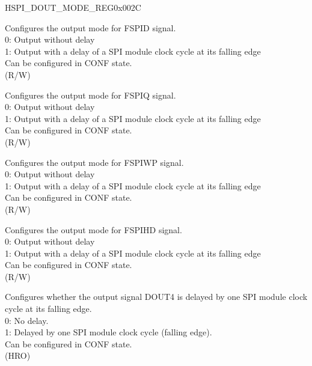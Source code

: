 \begin{register}{H}{SPI\_DOUT\_MODE\_REG}{0x002C}\label{regdesc:SPIDOUTMODEREG}
%
%
%
%
%
%
%
%
%
%
\regnewline%
\begin{regdesc}\begin{reglist}

\label{fielddesc:SPIDOUT0MODE}\item [SPI\_DOUT0\_MODE] Configures the output mode for FSPID signal.\\
0: Output without delay\\
1: Output with a delay of a SPI module clock cycle at its falling edge\\
Can be configured in CONF state.\\ (R/W)
\label{fielddesc:SPIDOUT1MODE}\item [SPI\_DOUT1\_MODE] Configures the output mode for FSPIQ signal.\\
0: Output without delay\\
1: Output with a delay of a SPI module clock cycle at its falling edge\\
Can be configured in CONF state.\\ (R/W)
\label{fielddesc:SPIDOUT2MODE}\item [SPI\_DOUT2\_MODE] Configures the output mode for FSPIWP signal.\\
0: Output without delay\\
1: Output with a delay of a SPI module clock cycle at its falling edge\\
Can be configured in CONF state.\\ (R/W)
\label{fielddesc:SPIDOUT3MODE}\item [SPI\_DOUT3\_MODE] Configures the output mode for FSPIHD signal.\\
0: Output without delay\\
1: Output with a delay of a SPI module clock cycle at its falling edge\\
Can be configured in CONF state.\\ (R/W)
\label{fielddesc:SPIDOUT4MODE}\item [SPI\_DOUT4\_MODE] Configures whether the output signal DOUT4 is delayed by one SPI module clock cycle at its falling edge.\\
0: No delay.\\
1: Delayed by one SPI module clock cycle (falling edge).\\
Can be configured in CONF state.\\
(HRO)


\end{reglist}
\end{regdesc}
\end{register}
